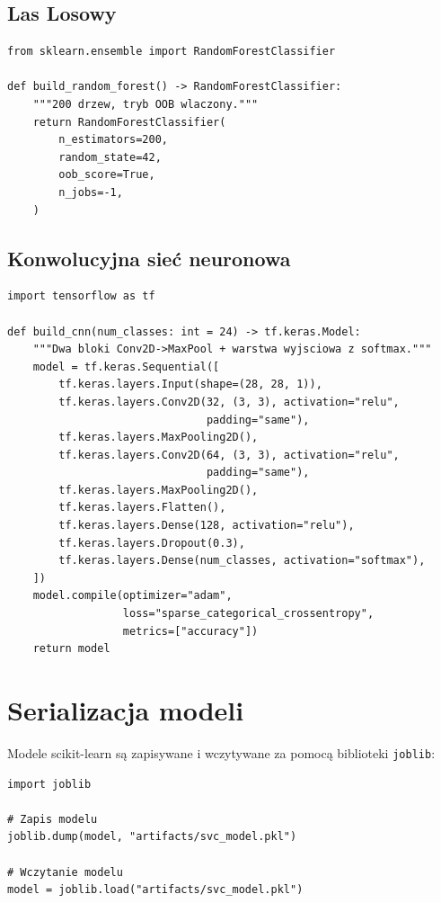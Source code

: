 \subsection{Las Losowy}

\begin{lstlisting}[style=stylePython, caption={Budowa Lasu Losowego (src/model/classifiers/random\_forest.py)}, label=lst:rf]
from sklearn.ensemble import RandomForestClassifier

def build_random_forest() -> RandomForestClassifier:
    """200 drzew, tryb OOB wlaczony."""
    return RandomForestClassifier(
        n_estimators=200,
        random_state=42,
        oob_score=True,
        n_jobs=-1,
    )
\end{lstlisting}

\newpage
\subsection{Konwolucyjna sieć neuronowa}

\begin{lstlisting}[style=stylePython, caption={Architektura CNN (src/model/classifiers/cnn.py)}, label=lst:cnn]
import tensorflow as tf

def build_cnn(num_classes: int = 24) -> tf.keras.Model:
    """Dwa bloki Conv2D->MaxPool + warstwa wyjsciowa z softmax."""
    model = tf.keras.Sequential([
        tf.keras.layers.Input(shape=(28, 28, 1)),
        tf.keras.layers.Conv2D(32, (3, 3), activation="relu",
                               padding="same"),
        tf.keras.layers.MaxPooling2D(),
        tf.keras.layers.Conv2D(64, (3, 3), activation="relu",
                               padding="same"),
        tf.keras.layers.MaxPooling2D(),
        tf.keras.layers.Flatten(),
        tf.keras.layers.Dense(128, activation="relu"),
        tf.keras.layers.Dropout(0.3),
        tf.keras.layers.Dense(num_classes, activation="softmax"),
    ])
    model.compile(optimizer="adam",
                  loss="sparse_categorical_crossentropy",
                  metrics=["accuracy"])
    return model
\end{lstlisting}

\section{Serializacja modeli}

Modele scikit-learn są zapisywane i wczytywane za pomocą biblioteki \texttt{joblib}:

\begin{lstlisting}[style=stylePython, caption={Zapis i odczyt modelu scikit-learn}, label=lst:joblib]
import joblib

# Zapis modelu
joblib.dump(model, "artifacts/svc_model.pkl")

# Wczytanie modelu
model = joblib.load("artifacts/svc_model.pkl")
\end{lstlisting}

